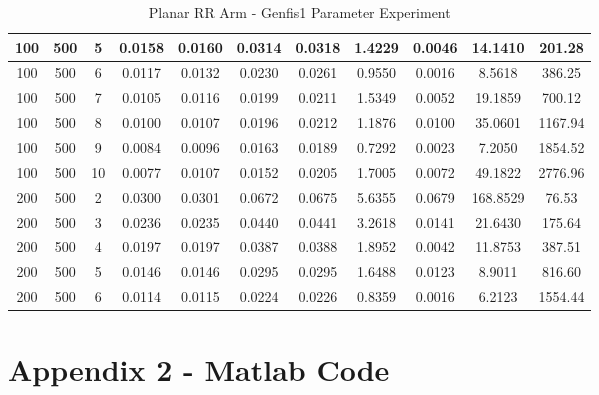 \documentclass[11.5pt, twoside, a4paper]{article}
\begin{document}
\begin{table}
{\begin{tabular}{|c | c | c | c | c | c | c | c | c | c  | c | }
100 &	500 &	5 &	0.0158 &	0.0160 &	0.0314 &	0.0318 &	1.4229 &	0.0046 &	14.1410 &		201.28 \\ \hline
100 &	500 &	6 &	0.0117 &	0.0132 &	0.0230 &	0.0261 &	0.9550 &	0.0016 &	8.5618 &		386.25 \\ \hline
100 &	500 &	7 &	0.0105 &	0.0116 &	0.0199 &	0.0211 &	1.5349 &	0.0052 &	19.1859 &		700.12 \\ \hline
100 &	500 &	8 &	0.0100 &	0.0107 &	0.0196 &	0.0212 &	1.1876 &	0.0100 &	35.0601 &		1167.94 \\ \hline
100 &	500 &	9 &	0.0084 &	0.0096 &	0.0163 &	0.0189 &	0.7292 &	0.0023 &	7.2050 &		1854.52 \\ \hline
100 &	500 &	10 &	0.0077 &	0.0107 &	0.0152 &	0.0205 &	1.7005 &	0.0072 &	49.1822 &		2776.96 \\ \hline
200 &	500 &	2 &	0.0300 &	0.0301 &	0.0672 &	0.0675 &	5.6355 &	0.0679 &	168.8529 &		76.53 \\ \hline
200 &	500 &	3 &	0.0236 &	0.0235 &	0.0440 &	0.0441 &	3.2618 &	0.0141 &	21.6430 &		175.64 \\ \hline
200 &	500 &	4 &	0.0197 &	0.0197 &	0.0387 &	0.0388 &	1.8952 &	0.0042 &	11.8753 &		387.51 \\ \hline
200 &	500 &	5 &	0.0146 &	0.0146 &	0.0295 &	0.0295 &	1.6488 &	0.0123 &	8.9011 &		816.60 \\ \hline
200 &	500 &	6 &	0.0114 &	0.0115 &	0.0224 &	0.0226 &	0.8359 &	0.0016 &	6.2123 &		1554.44 \\ \hline
\end{tabular}}
\caption{Planar RR Arm - Genfis1 Parameter Experiment \label{tab:2LinkGenfis1}}
\end{table}

\section{Appendix 2 - Matlab Code}








{}
\end{document}
